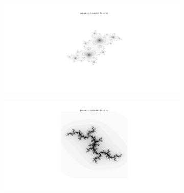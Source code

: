 \documentclass{article}
\begin{document}
\begin{figure}[h!]
  \centering
  \begin{subfigure}[b]{1\linewidth}
    \includegraphics[width=\linewidth]{Fractal_image/z^2+c_-01+0651.png}
  \end{subfigure}
  \begin{subfigure}[b]{1\linewidth}
    \includegraphics[width=\linewidth]{Fractal_image/z^2+c_-001+-0801.png}
  \end{subfigure}
\end{figure}

\newpage
\end{document}
